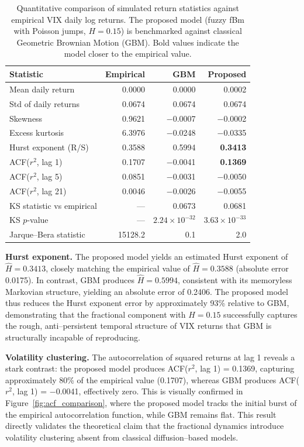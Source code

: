 \documentclass[12pt,a4paper]{report}
\numberwithin{equation}{section}
\begin{document}
\begin{table}[htbp]
\centering
\caption{Quantitative comparison of simulated return statistics against empirical VIX daily log returns. The proposed model (fuzzy fBm with Poisson jumps, $H=0.15$) is benchmarked against classical Geometric Brownian Motion (GBM). Bold values indicate the model closer to the empirical value.}
\label{tab:benchmark}
\begin{tabular}{l r r r}
\toprule
\textbf{Statistic} & \textbf{Empirical} & \textbf{GBM} & \textbf{Proposed} \\
\midrule
Mean daily return & 0.0000 & 0.0000 & 0.0002 \\
Std of daily returns & 0.0674 & 0.0674 & 0.0674 \\
Skewness & 0.9621 & $-$0.0007 & $-$0.0002 \\
Excess kurtosis & 6.3976 & $-$0.0248 & $-$0.0335 \\
Hurst exponent (R/S) & 0.3588 & 0.5994 & \textbf{0.3413} \\
ACF($r^2$, lag 1) & 0.1707 & $-$0.0041 & \textbf{0.1369} \\
ACF($r^2$, lag 5) & 0.0851 & $-$0.0031 & $-$0.0050 \\
ACF($r^2$, lag 21) & 0.0046 & $-$0.0026 & $-$0.0055 \\
\midrule
KS statistic vs empirical & --- & 0.0673 & 0.0681 \\
KS $p$-value & --- & $2.24 \times 10^{-32}$ & $3.63 \times 10^{-33}$ \\
Jarque--Bera statistic & 15\hspace{1pt}128.2 & 0.1 & 2.0 \\
\bottomrule
\end{tabular}
\end{table}

\textbf{Hurst exponent.} The proposed model yields an estimated Hurst exponent of $\hat{H} = 0.3413$, closely matching the empirical value of $\hat{H} = 0.3588$ (absolute error 0.0175). In contrast, GBM produces $\hat{H} = 0.5994$, consistent with its memoryless Markovian structure, yielding an absolute error of 0.2406. The proposed model thus reduces the Hurst exponent error by approximately 93\% relative to GBM, demonstrating that the fractional component with $H = 0.15$ successfully captures the rough, anti--persistent temporal structure of VIX returns that GBM is structurally incapable of reproducing.

\textbf{Volatility clustering.} The autocorrelation of squared returns at lag 1 reveals a stark contrast: the proposed model produces ACF($r^2$, lag 1) = 0.1369, capturing approximately 80\% of the empirical value (0.1707), whereas GBM produces ACF($r^2$, lag 1) = $-$0.0041, effectively zero. This is visually confirmed in Figure~\ref{fig:acf_comparison}, where the proposed model tracks the initial burst of the empirical autocorrelation function, while GBM remains flat. This result directly validates the theoretical claim that the fractional dynamics introduce volatility clustering absent from classical diffusion--based models.
\end{document}
